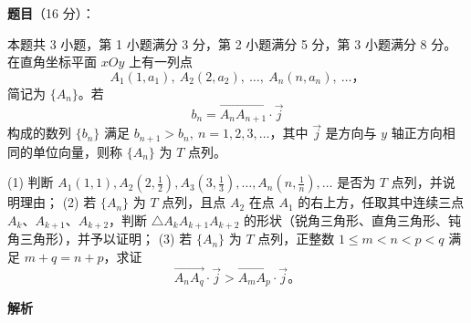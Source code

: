 \begin{answer}

\textbf{题目}（16 分）：

本题共 3 小题，第 1 小题满分 3 分，第 2 小题满分 5 分，第 3 小题满分 8 分。在直角坐标平面 \(xOy\) 上有一列点
\nopagebreak[4]
\[
A_1(1,a_1),\ A_2(2,a_2),\ \ldots,\ A_n(n,a_n),\ \ldots\text{，}
\]
简记为 \(\{A_n\}\)。若
\nopagebreak[4]
\[
b_n=\overrightarrow{A_nA_{n+1}}\cdot\vec j
\]
构成的数列 \(\{b_n\}\) 满足 \(b_{n+1}>b_n,\ n=1,2,3,\ldots\)，其中 \(\vec j\) 是方向与 \(y\) 轴正方向相同的单位向量，则称 \(\{A_n\}\) 为 \(T\) 点列。

(1) 判断 \(A_1(1,1), A_2(2,\frac12), A_3(3,\frac13),\ldots,A_n(n,\frac1n),\ldots\) 是否为 \(T\) 点列，并说明理由；
(2) 若 \(\{A_n\}\) 为 \(T\) 点列，且点 \(A_2\) 在点 \(A_1\) 的右上方，任取其中连续三点 \(A_k\text{、}A_{k+1}\text{、}A_{k+2}\)，判断 \(\triangle A_kA_{k+1}A_{k+2}\) 的形状（锐角三角形、直角三角形、钝角三角形），并予以证明；
(3) 若 \(\{A_n\}\) 为 \(T\) 点列，正整数 \(1\le m<n<p<q\) 满足 \(m+q=n+p\)，求证
\nopagebreak[4]
   \[
   \overrightarrow{A_nA_q}\cdot\vec j>\overrightarrow{A_mA_p}\cdot\vec j\text{。}
   \]

\textbf{解析}





\end{answer}
